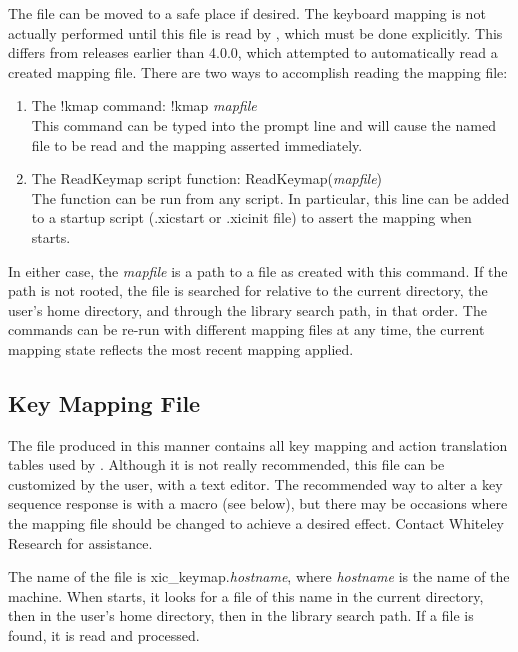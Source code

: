The file can be moved to a safe place if desired.  The keyboard
mapping is not actually performed until this file is read by {\Xic},
which must be done explicitly.  This differs from {\Xic} releases
earlier than 4.0.0, which attempted to automatically read a created
mapping file.  There are two ways to accomplish reading the mapping
file:

\begin{enumerate}
\item{The {\cb !kmap} command:  {\vt !kmap} {\it mapfile}\\
This command can be typed into the prompt line and will cause the
named file to be read and the mapping asserted immediately.}

\item{The {\vt ReadKeymap} script function:
  {\vt ReadKeymap(}{\it mapfile\/}{\vt )}\\
The function can be run from any script.  In particular, this line can
be added to a startup script ({\vt .xicstart} or {\vt .xicinit} file)
to assert the mapping when {\Xic} starts.}
\end{enumerate}

In either case, the {\it mapfile} is a path to a file as created with
this command.  If the path is not rooted, the file is searched for
relative to the current directory, the user's home directory, and
through the library search path, in that order.  The commands can be
re-run with different mapping files at any time, the current mapping
state reflects the most recent mapping applied.

\subsection{Key Mapping File}

The file produced in this manner contains all key mapping and action
translation tables used by {\Xic}.  Although it is not really
recommended, this file can be customized by the user, with a text
editor.  The recommended way to alter a key sequence response is with
a macro (see below), but there may be occasions where the mapping file
should be changed to achieve a desired effect.  Contact Whiteley
Research for assistance.

The name of the file is {\vt xic\_keymap.}{\it hostname}, where {\it
hostname} is the name of the machine.  When {\Xic} starts, it looks
for a file of this name in the current directory, then in the user's
home directory, then in the library search path.  If a file is found,
it is read and processed.

